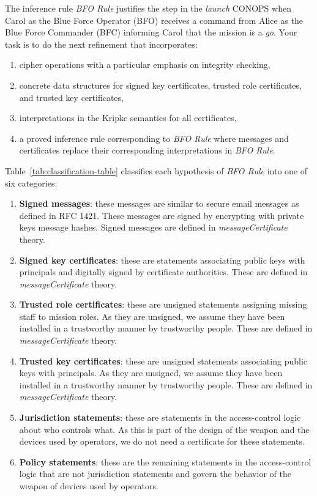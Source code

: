 \documentclass[10pt,twoside]{article}
\begin{document}
The inference rule \emph{BFO Rule} justifies the step in the
\emph{launch} CONOPS when Carol as the Blue Force Operator (BFO)
receives a command from Alice as the Blue Force Commander (BFC)
informing Carol that the mission is a \emph{go}. Your task is to do
the next refinement that incorporates:
\begin{enumerate}
\item cipher operations with a particular emphasis on integrity checking,
\item concrete data structures for signed key certificates, trusted
  role certificates, and trusted key certificates,
\item interpretations in the Kripke semantics for all certificates,
\item a proved inference rule corresponding to \emph{BFO Rule} where
  messages and certificates replace their corresponding
  interpretations in \emph{BFO Rule}.
\end{enumerate}

Table~\ref{tab:classification-table} classifies each hypothesis of
\emph{BFO Rule} into one of six categories:
\begin{enumerate}
\item \textbf{Signed messages}: these messages are similar to secure email
  messages as defined in RFC 1421. These messages are signed by
  encrypting with private keys message hashes. Signed messages are
  defined in \emph{messageCertificate} theory.
\item \textbf{Signed key certificates}: these are statements associating public
  keys with principals and digitally signed by certificate
  authorities. These are defined in \emph{messageCertificate} theory.
\item \textbf{Trusted role certificates}: these are unsigned
  statements assigning missing staff to mission roles. As they are
  unsigned, we assume they have been installed in a trustworthy manner
  by trustworthy people. These are defined in
  \emph{messageCertificate} theory.
\item \textbf{Trusted key certificates}: these are unsigned statements
  associating public keys with principals. As they are unsigned, we
  assume they have been installed in a trustworthy manner by
  trustworthy people. These are defined in \emph{messageCertificate}
  theory.
\item \textbf{Jurisdiction statements}: these are statements in the
  access-control logic about who controls what. As this is part of the
  design of the weapon and the devices used by operators, we do not
  need a certificate for these statements.
\item \textbf{Policy statements}: these are the remaining statements in
  the access-control logic that are not jurisdiction statements and
  govern the behavior of the weapon of devices used by operators.
\end{enumerate}
\end{document}
